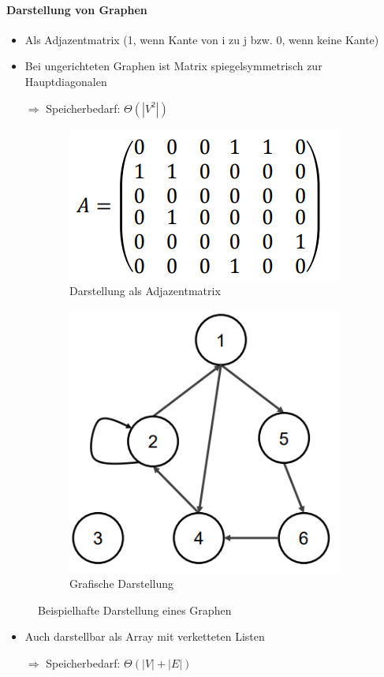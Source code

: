 \documentclass[
    ngerman,
    color=3b,
    dark_mode,
    load_common, %
    summary,
    boxarc,
]{tuda_summary}
\begin{document}
\paragraph{Darstellung von Graphen}
\begin{itemize}
    \item Als Adjazentmatrix (1, wenn Kante von i zu j bzw. 0, wenn keine Kante)
    \item Bei ungerichteten Graphen ist Matrix spiegelsymmetrisch zur Hauptdiagonalen
    \item[$\Longrightarrow$] Speicherbedarf: $\Theta(|V^2|)$
\end{itemize}
\begin{figure}[h]
    \centering
    \begin{subfigure}[c]{.5\textwidth}
        \centering
        \includegraphics[width=.5\textwidth]{pictures/graph1.PNG}
        \caption{Darstellung als Adjazentmatrix}
    \end{subfigure}
    \begin{subfigure}[c]{.49\textwidth}
        \centering
        \includegraphics[width=.5\textwidth]{pictures/graph2.PNG}
        \caption{Grafische Darstellung}
    \end{subfigure}
    \caption{Beispielhafte Darstellung eines Graphen}
\end{figure}
\begin{itemize}
    \item Auch darstellbar als Array mit verketteten Listen
    \item[$\Longrightarrow$] Speicherbedarf: $\Theta(|V| + |E|)$
\end{itemize}
\clearpage
\end{document}
